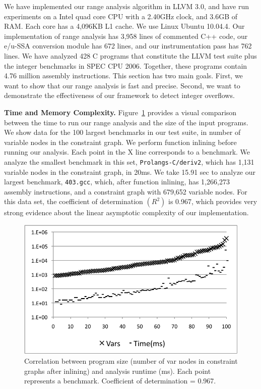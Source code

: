\documentclass[preprint]{sigplanconf}[10pt]
\begin{document}
We have implemented our range analysis algorithm in LLVM 3.0, and have run
experiments on a Intel quad core CPU with a 2.40GHz clock, and 3.6GB of RAM.
Each core has a 4,096KB L1 cache.
We use Linux Ubuntu 10.04.4.
Our implementation of range analysis has 3,958 lines of
commented C++ code, our e/u-SSA conversion module has 672 lines, and our
instrumentation pass has 762 lines.
We have analyzed 428 C programs that constitute the LLVM test suite plus the
integer benchmarks in SPEC CPU 2006.
Together, these programs contain 4.76 million assembly instructions.
This section has two main goals.
First, we want to show that our range analysis is fast and precise.
Second, we want to demonstrate the effectiveness of our framework to detect
integer overflows.

\noindent
\textbf{Time and Memory Complexity.}
Figure~\ref{fig:TimeCorr} provides a visual comparison between the time to
run our range analysis and the size of the input programs.
We show data for the 100 largest benchmarks in our test suite, in number
of variable nodes in the constraint graph.
We perform function inlining before running our analysis.
Each point in the X line corresponds to a benchmark.
We analyze the smallest benchmark in this set, \texttt{Prolangs-C/deriv2}, which
has 1,131 variable nodes in the constraint graph, in 20ms.
We take 15.91 sec to analyze our largest benchmark, \texttt{403.gcc}, which,
after function inlining, has 1,266,273 assembly instructions, and a
constraint graph with 679,652 variable nodes.
For this data set, the coefficient of determination $(R^2)$ is 0.967, which
provides very strong evidence about the linear asymptotic complexity of our
implementation.

\begin{figure}[t!]
\begin{center}
\includegraphics[width=\columnwidth]{images/TimeCorr}
\end{center}
\caption{\label{fig:TimeCorr}
Correlation between program size (number of var nodes in constraint
graphs after inlining) and analysis runtime (ms).
Each point represents a benchmark.
Coefficient of determination = 0.967.
}
\end{figure}
\end{document}
